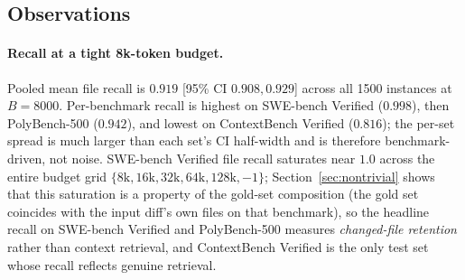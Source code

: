 \documentclass[11pt, a4paper]{article}
\begin{document}
\begin{table}[h]
\centering
\small
\caption{Per-language metrics with 95\% percentile bootstrap CIs ($B{=}10{,}000$). Pooled across the three test sets, \emph{intent-to-treat}: instances whose pipeline run failed (clone, apply, timeout) contribute recall $0$. The ok-only column reports mean recall over the $n_{\mathrm{ok}}$ instances with a completed selection. The out-of-memory kill class that dominated Go in the previous snapshot (21/40 instances) is resolved by the two-pass bounded edge construction; the remaining Go gap to ok-only is per-instance timeouts on near-dense-graph repositories.}
\label{tab:prelim-lang}
\end{table}

\subsection{Observations}

\paragraph{Recall at a tight 8k-token budget.} Pooled mean file recall is $0.919$ [95\% CI $0.908, 0.929$] across all 1500 instances at $B{=}8000$. Per-benchmark recall is highest on SWE-bench Verified ($0.998$), then PolyBench-500 ($0.942$), and lowest on ContextBench Verified ($0.816$); the per-set spread is much larger than each set's CI half-width and is therefore benchmark-driven, not noise. SWE-bench Verified file recall saturates near $1.0$ across the entire budget grid $\{8\mathrm{k}, 16\mathrm{k}, 32\mathrm{k}, 64\mathrm{k}, 128\mathrm{k}, -1\}$; Section~\ref{sec:nontrivial} shows that this saturation is a property of the gold-set composition (the gold set coincides with the input diff's own files on that benchmark), so the headline recall on SWE-bench Verified and PolyBench-500 measures \emph{changed-file retention} rather than context retrieval, and ContextBench Verified is the only test set whose recall reflects genuine retrieval.
\end{document}
